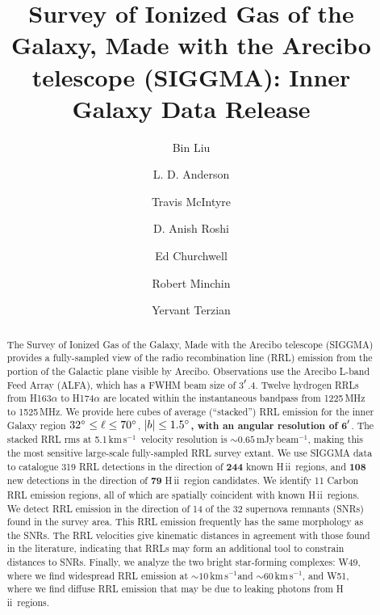 \documentclass[manuscript]{aastex61}
\newcommand{\hii}{{\rm H\,}{{\sc ii}}}
\newcommand{\kms}{\,km\,s$^{-1}$}
\begin{document}
\title{Survey of Ionized Gas of the Galaxy, Made with the Arecibo telescope (SIGGMA): Inner Galaxy Data Release}

\author[0000-0002-1311-8839]{Bin Liu}
\author{L. D. Anderson}
\author{Travis McIntyre}
\author{D. Anish Roshi}
\author{Ed Churchwell}
\author{Robert Minchin}
\author{Yervant Terzian}

\begin{abstract}
The Survey of Ionized Gas of the Galaxy, Made with the Arecibo telescope (SIGGMA) provides a fully-sampled view of the radio recombination line (RRL) emission from the portion of the Galactic plane visible by Arecibo.
Observations use the Arecibo L-band Feed Array (ALFA), which has a FWHM beam size of 3$\mbox{$^\prime$}$.4. 
Twelve hydrogen RRLs from H163$\alpha$ to H174$\alpha$ are located within the instantaneous bandpass from 1225\,MHz to 1525\,MHz.
We provide here cubes of average (``stacked'') RRL emission for the inner Galaxy region $32\mbox{$^\circ$} \le \ell \le 70\mbox{$^\circ$}$, $|b|\le1.5\mbox{$^\circ$}$\textbf{, with an angular resolution of 6$\mbox{$^\prime$}$}.
The stacked RRL rms at 5.1\kms\ velocity resolution is $\sim0.65$\,mJy\,beam$^{-1}$, making this the most sensitive large-scale fully-sampled RRL survey extant.
We use SIGGMA data to catalogue 319 RRL detections in the direction of \textbf{244} known \hii\ regions, and \textbf{108} new detections in the direction of \textbf{79} \hii\ region candidates. 
We identify 11 Carbon RRL emission regions, all of which are spatially coincident with known \hii\ regions. 
We detect RRL emission in the direction of 14 of the 32 supernova remnants (SNRs) found in the survey area.
This RRL emission frequently has the same morphology as the SNRs. The RRL velocities give kinematic distances in agreement with those found in the literature, indicating that RRLs may form an additional tool to constrain distances to SNRs.
Finally, we analyze the two bright star-forming complexes: W49, where we find widespread RRL emission at $\sim10$\kms and $\sim60$\kms, and W51, where we find diffuse RRL emission that may be due to leaking photons from \hii\ regions. 
\end{abstract}
\end{document}
